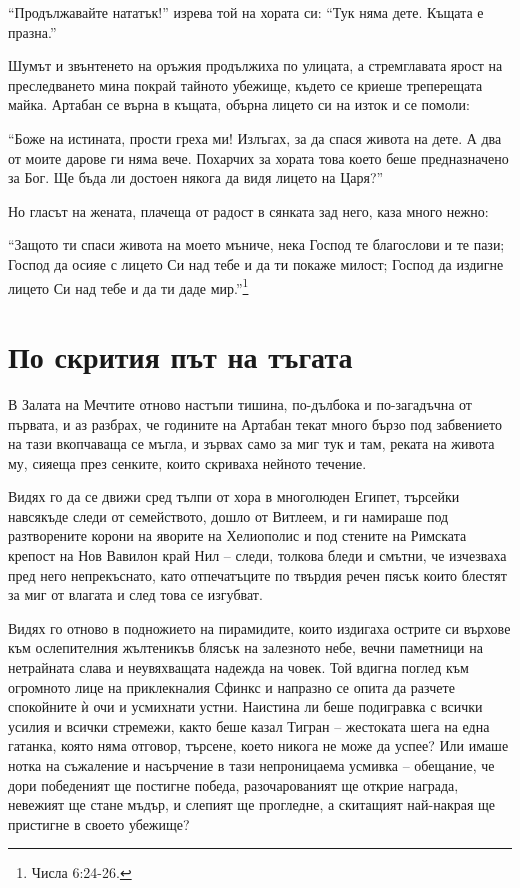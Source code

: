 \documentclass[oneside,10pt]{memoir}
\begin{document}
``Продължавайте нататък!'' изрева той на хората си: ``Тук няма дете. Къщата е
празна.''

Шумът и звънтенето на оръжия продължиха по улицата, а стремглавата ярост на
преследването мина покрай тайното убежище, където се криеше треперещата майка.
Артабан се върна в къщата, обърна лицето си на изток и се помоли:

``Боже на истината, прости греха ми! Излъгах, за да спася живота на дете. А два
от моите дарове ги няма вече. Похарчих за хората това което беше предназначено
за Бог. Ще бъда ли достоен някога да видя лицето на Царя?''

Но гласът на жената, плачеща от радост в сянката зад него, каза много нежно:

``Защото ти спаси живота на моето мъниче, нека Господ те благослови и те пази;
Господ да осияе с лицето Си над тебе и да ти покаже милост; Господ да издигне
лицето Си над тебе и да ти даде мир.''\footnote{Числа 6:24-26.}

\part{По скрития път на тъгата}

В Залата на Мечтите отново настъпи тишина, по-дълбока и по-загадъчна от първата,
и аз разбрах, че годините на Артабан текат много бързо под забвението на тази
вкопчаваща се мъгла, и зървах само за миг тук и там, реката на живота му, сияеща
през сенките, които скриваха нейното течение.

Видях го да се движи сред тълпи от хора в многолюден Египет, търсейки навсякъде
следи от семейството, дошло от Витлеем, и ги намираше под разтворените корони на
яворите на Хелиополис и под стените на Римската крепост на Нов Вавилон край Нил
-- следи, толкова бледи и смътни, че изчезваха пред него непрекъснато, като
отпечатъците по твърдия речен пясък които блестят за миг от влагата и след това
се изгубват.

Видях го отново в подножието на пирамидите, които издигаха острите си върхове
към ослепителния жълтеникъв блясък на залезното небе, вечни паметници на
нетрайната слава и неувяхващата надежда на човек. Той вдигна поглед към
огромното лице на приклекналия Сфинкс и напразно се опита да разчете спокойните
ѝ очи и усмихнати устни. Наистина ли беше подигравка с всички усилия и всички
стремежи, както беше казал Тигран -- жестоката шега на една гатанка, която няма
отговор, търсене, което никога не може да успее? Или имаше нотка на съжаление и
насърчение в тази непроницаема усмивка -- обещание, че дори победеният ще
постигне победа, разочарованият ще открие награда, невежият ще стане мъдър, и
слепият ще прогледне, а скитащият най-накрая ще пристигне в своето убежище?
\end{document}
